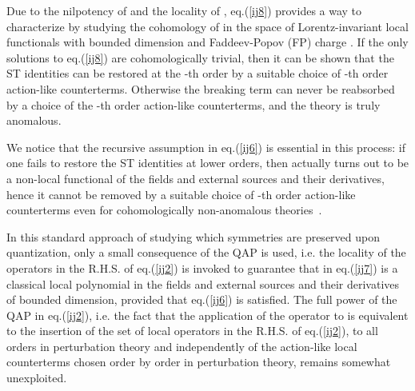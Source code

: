 \documentclass[a4paper,11pt]{article}
\def\G{\Gamma}
\begin{document}
Due to the nilpotency of \coordHE{}
and  the locality of \coordHE{}, eq.(\ref{ij8})
provides a way to characterize \coordHE{} by studying
the cohomology of \coordHE{} in the space of 
Lorentz-invariant local
functionals with bounded dimension and Faddeev-Popov (FP) charge \coordHE{} 
\cite{PS}.
If the only solutions to eq.(\ref{ij8}) are cohomologically trivial,
then it can be shown that the ST identities can be restored at the \coordHE{}-th order
by a suitable choice of \coordHE{}-th order action-like counterterms.
Otherwise the breaking term \coordHE{} can never be reabsorbed
by a choice of the \coordHE{}-th order action-like counterterms, and the theory
is truly anomalous.

We notice that the recursive assumption in eq.(\ref{ij6}) is essential in this process:
if one fails to restore the ST identities at lower orders,
then \coordHE{} actually turns out to be a non-local
functional of the fields and external sources and their
derivatives, hence it cannot be removed by a suitable
choice of \coordHE{}-th order action-like counterterms even
for cohomologically non-anomalous theories~\cite{pq}.

In this standard approach of studying which symmetries are
preserved upon quantization, only a small consequence
of the QAP is used, i.e. the locality of the operators
\coordHE{} in the R.H.S. of eq.(\ref{ij2}) is invoked
 to guarantee that \coordHE{}
in eq.(\ref{ij7}) is a classical local  polynomial in the fields and external sources and their
derivatives of bounded dimension, provided that eq.(\ref{ij6}) is satisfied.
The full power of the QAP in eq.(\ref{ij2}), i.e. the
fact that the application of the operator \coordHE{} to \myHighlight{$\G$}\coordHE{}
is equivalent to the insertion of the set of local operators
 in the R.H.S. of eq.(\ref{ij2}),
to all orders in perturbation theory  and independently
of the action-like local counterterms chosen order by order
in perturbation theory, remains somewhat unexploited.
\end{document}

